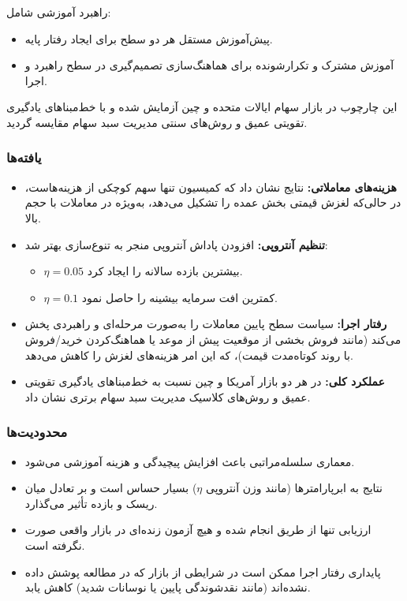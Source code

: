 \documentclass[12pt, a4paper]{report}
\begin{document}
راهبرد آموزشی شامل:
\begin{itemize}
    \item پیش‌آموزش مستقل هر دو سطح برای ایجاد رفتار پایه.  
    \item آموزش مشترک و تکرارشونده برای هماهنگ‌سازی تصمیم‌گیری در سطح راهبرد و اجرا.  
\end{itemize}

این چارچوب در بازار سهام ایالات متحده و چین آزمایش شده و با خط‌مبناهای یادگیری تقویتی عمیق  و روش‌های سنتی مدیریت سبد سهام مقایسه گردید.

\subsubsection{یافته‌ها}
\begin{itemize}
    \item \textbf{هزینه‌های معاملاتی:} نتایج نشان داد که کمیسیون تنها سهم کوچکی از هزینه‌هاست، در حالی‌که لغزش قیمتی بخش عمده را تشکیل می‌دهد، به‌ویژه در معاملات با حجم بالا.  
    \item \textbf{تنظیم آنتروپی:} افزودن پاداش آنتروپی منجر به تنوع‌سازی بهتر شد:  
    \begin{itemize}
        \item $\eta = 0.05$ بیشترین بازده سالانه را ایجاد کرد.  
        \item $\eta = 0.1$ کمترین افت سرمایه بیشینه را حاصل نمود.  
    \end{itemize}
    \item \textbf{رفتار اجرا:} سیاست سطح پایین معاملات را به‌صورت مرحله‌ای و راهبردی پخش می‌کند (مانند فروش بخشی از موقعیت پیش از موعد یا هماهنگ‌کردن خرید/فروش با روند کوتاه‌مدت قیمت)، که این امر هزینه‌های لغزش را کاهش می‌دهد.  
    \item \textbf{عملکرد کلی:}  در هر دو بازار آمریکا و چین نسبت به خط‌مبناهای یادگیری تقویتی عمیق  و روش‌های کلاسیک مدیریت سبد سهام برتری نشان داد.  
\end{itemize}

\subsubsection{محدودیت‌ها}
\begin{itemize}
    \item معماری سلسله‌مراتبی باعث افزایش پیچیدگی و هزینه آموزشی می‌شود.  
    \item نتایج به ابرپارامترها (مانند وزن آنتروپی $\eta$) بسیار حساس است و بر تعادل میان ریسک و بازده تأثیر می‌گذارد.  
    \item ارزیابی تنها از طریق  انجام شده و هیچ آزمون زنده‌ای در بازار واقعی صورت نگرفته است.  
    \item پایداری رفتار اجرا ممکن است در شرایطی از بازار که در مطالعه پوشش داده نشده‌اند (مانند نقدشوندگی پایین یا نوسانات شدید) کاهش یابد.  
\end{itemize}
\end{document}
